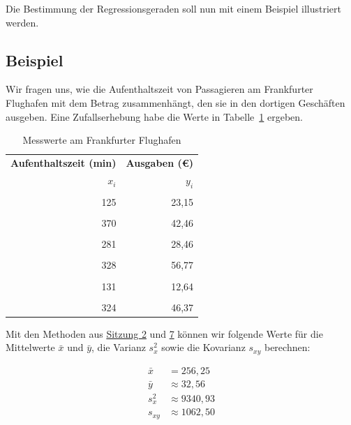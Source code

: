 \documentclass[
  11pt,
  ngerman,
  a4paper,
]{report}
\begin{document}
Die Bestimmung der Regressionsgeraden soll nun mit einem Beispiel illustriert werden.

\hypertarget{beispiel-26}{%
\subsection{Beispiel}\label{beispiel-26}}

Wir fragen uns, wie die Aufenthaltszeit von Passagieren am Frankfurter Flughafen mit dem Betrag zusammenhängt, den sie in den dortigen Geschäften ausgeben. Eine Zufallserhebung habe die Werte in Tabelle~\ref{tab:duty1} ergeben.

\begin{table}

\caption{\label{tab:duty1}Messwerte am Frankfurter Flughafen}
\centering
\begin{tabular}[t]{rr}
\toprule
\multicolumn{1}{c}{\textbf{Aufenthaltszeit (min)}} & \multicolumn{1}{c}{\textbf{Ausgaben (€)}} \\
\cmidrule(l{3pt}r{3pt}){1-1} \cmidrule(l{3pt}r{3pt}){2-2}
\textbf{$x_i$} & \textbf{$y_i$}\\
\midrule
\cellcolor{gray!6}{121} & \cellcolor{gray!6}{17,94}\\
125 & 23,15\\
\cellcolor{gray!6}{293} & \cellcolor{gray!6}{44,31}\\
370 & 42,46\\
\cellcolor{gray!6}{246} & \cellcolor{gray!6}{35,51}\\
281 & 28,46\\
\cellcolor{gray!6}{169} & \cellcolor{gray!6}{18,47}\\
328 & 56,77\\
\cellcolor{gray!6}{388} & \cellcolor{gray!6}{40,11}\\
131 & 12,64\\
\cellcolor{gray!6}{299} & \cellcolor{gray!6}{24,54}\\
324 & 46,37\\
\bottomrule
\end{tabular}
\end{table}

Mit den Methoden aus \protect\hyperlink{einleitende-bemerkungen}{Sitzung 2} und \protect\hyperlink{kovarianz}{7} können wir folgende Werte für die Mittelwerte \(\bar{x}\) und \(\bar{y}\), die Varianz \(s^2_x\) sowie die Kovarianz \(s_{xy}\) berechnen:

\[
\begin{aligned}
\bar{x}&=256{,}25\\
\bar{y}&\approx 32{,}56\\
s^2_{x}&\approx9340{,}93\\
s_{xy}&\approx 1062{,}50
\end{aligned}
\]
\end{document}
